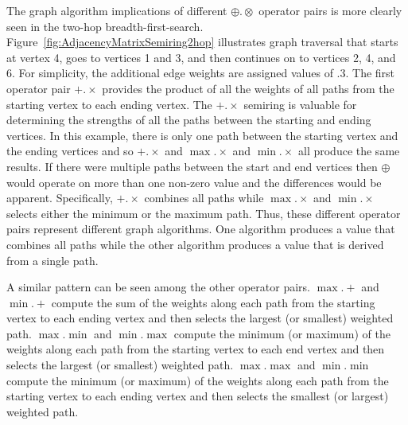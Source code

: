   The graph algorithm implications of different ${\oplus}.{\otimes}$ operator pairs is more clearly seen in the two-hop breadth-first-search.  Figure~\ref{fig:AdjacencyMatrixSemiring2hop} illustrates graph traversal that starts at vertex 4, goes to vertices 1 and 3, and then continues on to vertices 2, 4, and 6. For simplicity, the additional edge weights are assigned values of .3.  The first operator pair ${+}.{\times}$ provides the product of all the weights of all paths from the starting vertex to each ending vertex.  The ${+}.{\times}$ semiring is valuable for determining the strengths of all the paths between the starting and ending vertices.  In this example,  there is only one path between the starting vertex and the ending vertices and so ${+}.{\times}$ and ${\max}.{\times}$ and ${\min}.{\times}$ all produce the same results.  If there were multiple paths between the start and end vertices then $\oplus$ would operate on more than one non-zero value and the differences would be apparent.  Specifically, ${+}.{\times}$ combines all paths while ${\max}.{\times}$ and ${\min}.{\times}$ selects either the minimum or the maximum path.  Thus, these different operator pairs represent  different graph algorithms.  One algorithm produces a value that combines all paths while the other algorithm produces a value that is derived from a single path.

   A similar pattern can be seen among the other operator pairs.   ${\max}.{+}$ and ${\min}.{+}$ compute the sum of the weights along each path from the starting vertex to each ending vertex and then selects the largest (or smallest) weighted path.  ${\max}.{\min}$ and ${\min}.{\max}$ compute the minimum (or maximum) of the weights along each path from the starting vertex to each end vertex and then selects the largest (or smallest) weighted path.   ${\max}.{\max}$ and ${\min}.{\min}$ compute the minimum (or maximum) of the weights along each path from the starting vertex to each ending vertex and then selects the smallest (or largest) weighted path.
   
